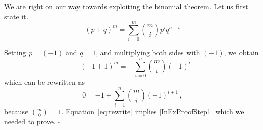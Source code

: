 We are right on our way towards exploiting the binomial theorem. Let us first state it.
\begin{equation} \label{binomTheorem}
(p + q)^{m} = \underset{i=0}{\overset{m}{\sum}} \binom{m}{i} p^{i}q^{n-i} 
\end{equation}

Setting $p=(-1)$ and $q=1$, and multiplying both sides with $(-1)$, we obtain
\[
-(-1+1)^m = - \sum_{i=0}^n \binom{m}{i} (-1)^{i}
\]
which can be rewritten as
\begin{equation} \label{eq:rewrite}
0 = -1 + \sum_{i=1}^n \binom{m}{i} (-1)^{i+1} \, ,
\end{equation}
because $\binom{m}{0} = 1$. Equation~\eqref{eq:rewrite} implies \eqref{InExProofStep1} which we needed to prove. $ \square $\bigskip
%
%
%
%

